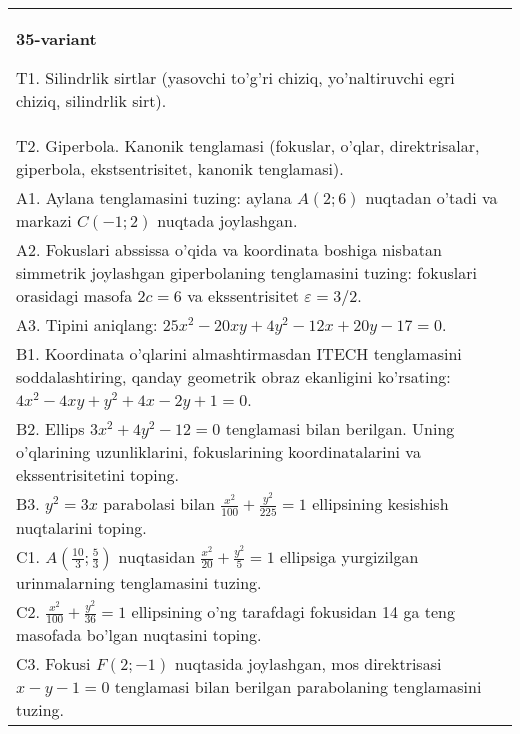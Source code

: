 \documentclass{article}
\begin{document}
\begin{tabular}{m{17cm}}
\textbf{35-variant}
\newline

T1. Silindrlik sirtlar (yasovchi to'g'ri chiziq, yo'naltiruvchi egri chiziq, silindrlik sirt).\\

T2. Giperbola. Kanonik tenglamasi (fokuslar, o'qlar, direktrisalar, giperbola, ekstsentrisitet, kanonik tenglamasi).\\

A1. Aylana tenglamasini tuzing: aylana $A(2;6)$ nuqtadan o'tadi va markazi $C(-1;2)$ nuqtada joylashgan.\\

A2. Fokuslari abssissa o'qida va koordinata boshiga nisbatan simmetrik joylashgan giperbolaning tenglamasini tuzing: fokuslari orasidagi masofa $2c=6$ va ekssentrisitet $\varepsilon=3/2$.\\

A3. Tipini aniqlang: $25x^{2}-20xy+4y^{2}-12x+20y-17=0$.\\

B1. Koordinata o'qlarini almashtirmasdan ITECH tenglamasini soddalashtiring, qanday geometrik obraz ekanligini ko'rsating: $4x^{2} - 4xy + y^{2} + 4x - 2y + 1 = 0$.  \\

B2. Ellips $3x^{2} + 4y^{2} - 12 = 0$ tenglamasi bilan berilgan. Uning o'qlarining uzunliklarini, fokuslarining koordinatalarini va ekssentrisitetini toping.  \\

B3. $y^{2} = 3x$ parabolasi bilan $\frac{x^{2}}{100} + \frac{y^{2}}{225} = 1$ ellipsining kesishish nuqtalarini toping.  \\

C1. $A(\frac{10}{3};\frac{5}{3})$ nuqtasidan $\frac{x^{2}}{20} + \frac{y^{2}}{5} = 1$ ellipsiga yurgizilgan urinmalarning tenglamasini tuzing.  \\

C2. $\frac{x^{2}}{100} + \frac{y^{2}}{36} = 1$ ellipsining o'ng tarafdagi fokusidan 14 ga teng masofada bo'lgan nuqtasini toping.  \\

C3. Fokusi $F(2; - 1)$ nuqtasida joylashgan, mos direktrisasi $x - y - 1 = 0$ tenglamasi bilan berilgan parabolaning tenglamasini tuzing.  \\

\end{tabular}
\vspace{1cm}
\end{document}
